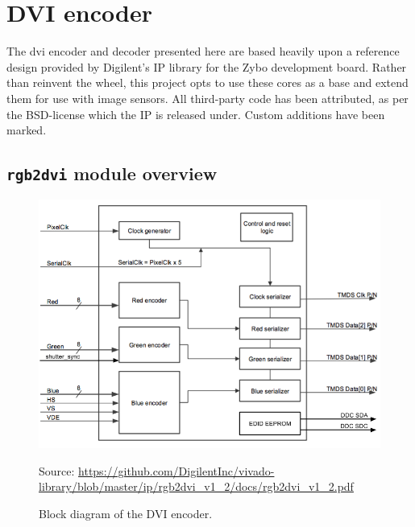 \section{DVI encoder}


The \gls{dvi} encoder and decoder presented here are based heavily upon a reference design provided by Digilent's IP library for the Zybo development board. Rather than reinvent the wheel, this project opts to use these cores as a base and extend them for use with image sensors. All third-party code has been attributed, as per the BSD-license which the IP is released under. Custom additions have been marked.

\subsection{\texttt{rgb2dvi} module overview}
\begin{figure}
  \centering
  \includegraphics[width=1\textwidth]{./img/rgb2dvi.png}\par
  Source: \url{https://github.com/DigilentInc/vivado-library/blob/master/ip/rgb2dvi_v1_2/docs/rgb2dvi_v1_2.pdf}
  \caption{Block diagram of the DVI encoder.}
  \label{fig:rgb2dvi}
\end{figure}

